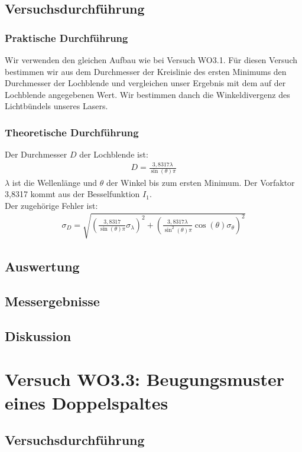 \documentclass[12pt]{scrartcl}
\begin{document}
\subsection{Versuchsdurchführung}

\subsubsection{Praktische Durchführung}
Wir verwenden den gleichen Aufbau wie bei Versuch WO3.1. Für diesen Versuch bestimmen wir aus dem Durchmesser der Kreislinie des ersten Minimums den Durchmesser der Lochblende und vergleichen unser Ergebnis mit dem auf der Lochblende angegebenen Wert. Wir bestimmen danch die Winkeldivergenz des Lichtbündels unseres Lasers.
\subsubsection{Theoretische Durchführung}
Der Durchmesser $D$ der Lochblende ist:
\begin{align}
D = \frac{3,8317 \lambda}{\sin(\theta)\pi}
\end{align}
$\lambda$ ist die Wellenlänge und $\theta$ der Winkel bis zum ersten Minimum. Der Vorfaktor 3,8317 kommt aus der Besselfunktion $I_1$.\\
Der zugehörige Fehler ist:
\begin{align}
\sigma_D = \sqrt{
\left(\frac{3,8317}{\sin(\theta)\pi}\sigma_\lambda \right)^2+
\left(\frac{3,8317\lambda}{\sin^2(\theta)\pi}\cos(\theta)
\sigma_\theta \right)^2}
\end{align}
\subsection{Auswertung}
\subsection{Messergebnisse}
\subsection{Diskussion}

\section{Versuch WO3.3: Beugungsmuster eines Doppelspaltes}
\subsection{Versuchsdurchführung}
\end{document}
